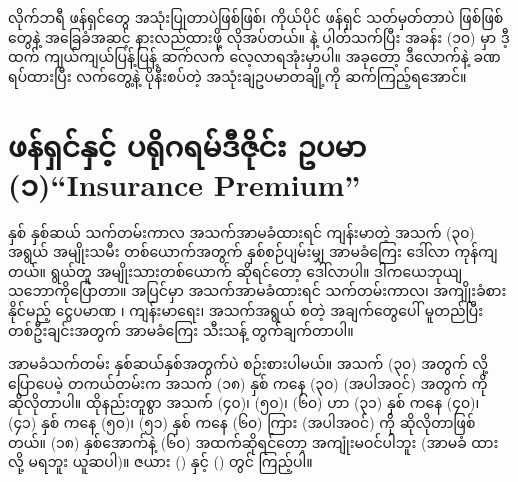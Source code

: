လိုက်ဘရီ ဖန်ရှင်တွေ အသုံးပြုတာပဲဖြစ်ဖြစ်၊ ကိုယ်ပိုင် ဖန်ရှင် သတ်မှတ်တာပဲ ဖြစ်ဖြစ်  တွေနဲ့   အခြေခံအဆင့် နားလည်ထားဖို့ လိုအပ်တယ်။  နဲ့ ပါတ်သက်ပြီး အခန်း (၁၀)  မှာ ဒီ့ထက် ကျယ်ကျယ်ပြန့်ပြန့် ဆက်လက် လေ့လာရအုံးမှာပါ။  အခုတော့ ဒီလောက်နဲ့ ခဏရပ်ထားပြီး လက်တွေ့နဲ့ ပိုနီးစပ်တဲ့  အသုံးချဥပမာတချို့ကို ဆက်ကြည့်ရအောင်။

\section{ဖန်ရှင်နှင့် ပရိုဂရမ်ဒီဇိုင်း ဥပမာ (၁)\qquad“Insurance Premium”}
နှစ် နှစ်ဆယ် သက်တမ်းကာလ  အသက်အာမခံထားရင် ကျန်းမာတဲ့ အသက် (၃၀) အရွယ် အမျိုးသမီး တစ်ယောက်အတွက် နှစ်စဉ်ပျမ်းမျှ အာမခံကြေး   ဒေါ်လာ ကုန်ကျတယ်။ ရွယ်တူ အမျိုးသားတစ်ယောက် ဆိုရင်တော့  ဒေါ်လာပါ။ ဒါကယေဘုယျ သဘောကိုပြောတာ။ အပြင်မှာ အသက်အာမခံထားရင် သက်\allowbreak တမ်းကာလ၊ အကျိုးခံစားနိုင်မည့် ငွေပမာဏ ၊ ကျန်းမာရေး၊ အသက်အရွယ်  စတဲ့ အချက်တွေပေါ် မူတည်ပြီး တစ်ဦးချင်းအတွက် အာမခံကြေး သီးသန့် တွက်ချက်တာပါ။

အာမခံသက်တမ်း နှစ်ဆယ်နှစ်အတွက်ပဲ စဉ်းစားပါမယ်။ အသက် (၃၀) အတွက်  လို့ပြောပေမဲ့ တကယ်တမ်းက အသက် (၁၈) နှစ် ကနေ (၃၀) (အပါအဝင်) အတွက်  ကို ဆိုလိုတာပါ။ ထိုနည်းတူစွာ အသက် (၄၀)၊ (၅၀)၊ (၆၀)  ဟာ (၃၁) နှစ် ကနေ (၄၀)၊ (၄၁) နှစ် ကနေ (၅၀)၊ (၅၁) နှစ် ကနေ (၆၀) ကြား (အပါအဝင်) ကို ဆိုလိုတာဖြစ်တယ်။ (၁၈) နှစ်အောက်နဲ့ (၆၀) အထက်ဆိုရင်တော့ အကျုံးမဝင်ပါဘူး (အာမခံ ထားလို့ မရဘူး ယူဆပါ)။ ဇယား (\fRefNo{\ref{tbl:premiumF}}) နှင့် (\fRefNo{\ref{tbl:premiumM}}) တွင် ကြည့်ပါ။

